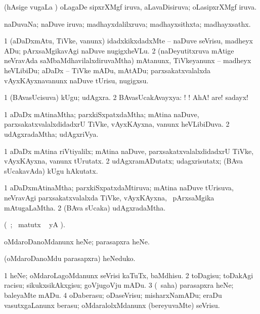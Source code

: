 \bentry
{}
\gl{\gu}
\bmng
(hAsige \mo vugaLa \vi) oLagaDe sipxrXMgf iruva, aLavaDisiruva; oLasipxrXMgf iruva. 
\emng
\eentry

\bentry
{}
\gl{\gu}
\bmng
naDuvaNa; naDuve iruva; madhayxdalilxruva; madhayxsithxta; madhayxsathx. 
\emng
\eentry

\bentry
{}
\gl{\sakirx}
\bmng
\bnum
\num{1} (aDaDxmAtu, TiVke, \mo vanunx) idadxkikxdadxMte -- naDuve seVrisu, madheyx ADu; pArxsaMgikavAgi naDuve nugigxheVLu. 
\num{2} (naDeyutitxruva mAtige neVravAda saMbaMdhavilalxdiruvaMtha) mAtanunx, TiVkeyanunx -- madheyx heVLibiDu; aDaDx -- TiVke mADu, mAtADu; parxsakatxvalalxda vAyxKAyxnavanunx naDuve tUrisu, nugigxsu. 
\enum
\emng
\eentry

\bentry
{}
\gl{\nA}
\bmng
\bnum
\num{1} (BAvasUcisuva) kUgu; udAgxra. 
\num{2} BAvasUcakAvayxya: ! ! AhA! are! sadayx! 
\enum
\emng
\eentry

\bentry
{}
\gl{\gu}
\bmng
\bnum
\num{1} aDaDx mAtinaMtha; parxkiSxpatxdaMtha; mAtina naDuve, parxsakatxvalalxdidadxrU TiVke, vAyxKAyxna, \mo vanunx heVLibiDuva. 
\num{2} udAgxradaMtha; udAgxriVya. 
\enum
\emng
\eentry

\bentry
{}
\gl{\kirxvi}
\bmng
\bnum
\num{1} aDaDx mAtina riVtiyalilx; mAtina naDuve, parxsakatxvalalxdidadxrU TiVke, vAyxKAyxna, \mo vanunx tUrutatx. 
\num{2} udAgxramADutatx; udagxrisutatx; (BAva sUcakavAda) kUgu hAkutatx. 
\enum
\emng
\eentry

\bentry
{}
\gl{\gu}
\bmng
\bnum
\num{1} aDaDxmAtinaMtha; parxkiSxpatxdaMtiruva; mAtina naDuve tUrisuva, neVravAgi parxsakatxvalalxda TiVke, vAyxKAyxna, \mo\ pArxsaMgika mAtugaLaMtha. 
\num{2} (BAva sUcaka) udAgxradaMtha. 
\enum
\emng
\eentry

\bentry
{}
\gl{\kirx}
\bmng
(\vakaq\ ; \BU\ matutx \BUkaq\  yA ).
\emng

\noindent
\gl{\sakirx}
\bmng
oMdaroDanoMdanunx heNe; parasapxra heNe. 
\emng

\noindent 
\gl{\akirx}
\bmng
(oMdaroDanoMdu parasapxra) heNeduko. 
\emng
\eentry

\bentry
{}
\gl{\sakirx}
\bmng
\bnum
\num{1} heNe; oMdaroLagoMdanunx seVrisi kaTuTx, baMdhisu. 
\num{2} toDagisu; toDakAgi racisu; sikukxsikAkxgisu; goVjugoVju mADu. 
\num{3} (\rUpa\ saha) parasapxra heNe; baleyaMte mADu. 
\num{4} oDaberasu; oDaseVrisu; misharxNamADu; eraDu vasutxgaLanunx berasu; oMdaralolxMdanunx (bereyuvaMte) seVrisu. 
\enum
\emng

